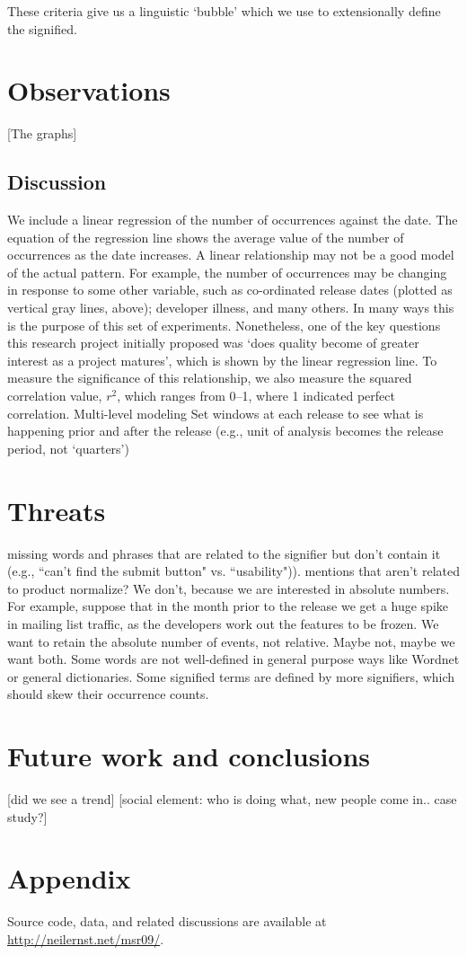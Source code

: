 \documentclass[conference, compsoc]{IEEEtran}
\begin{document}
These criteria give us a linguistic `bubble' which we use to extensionally define the signified.

\section{Observations}
[The graphs]
\subsection{Discussion}
We include a linear regression of the number of occurrences against the date. The equation of the regression line shows the average value of the number of occurrences as the date increases. A linear relationship may not be a good model of the actual pattern. For example, the number of occurrences may be changing in response to some other variable, such as co-ordinated release dates (plotted as vertical gray lines, above); developer illness, and many others. In many ways this is the purpose of this set of experiments. Nonetheless, one of the key questions this research project initially proposed was `does quality become of greater interest as a project matures', which is shown by the linear regression line. To measure the significance of this relationship, we also measure the squared correlation value, $r^2$, which ranges from 0--1, where 1 indicated perfect correlation.
Multi-level modeling
Set windows at each release to see what is happening prior and after the release (e.g., unit of analysis becomes the release period, not `quarters')
\section{Threats}
missing words and phrases that are related to the signifier but don't contain it (e.g., ``can't find the submit button" vs. ``usability")). 
mentions that aren't related to product
normalize? We don't, because we are interested in absolute numbers. For example, suppose that in the month prior to the release we get a huge spike in mailing list traffic, as the developers work out the features to be frozen. We want to retain the absolute number of events, not relative. Maybe not, maybe we want both.
Some words are not well-defined in general purpose ways like Wordnet or general dictionaries.
Some signified terms are defined by more signifiers, which should skew their occurrence counts.
\section{Future work and conclusions}
[did we see a trend]
[social element: who is doing what, new people come in.. case study?]
\section{Appendix}
Source code, data, and related discussions are available at \url{http://neilernst.net/msr09/}.
\begin{footnotesize}

\end{footnotesize}
\end{document}
